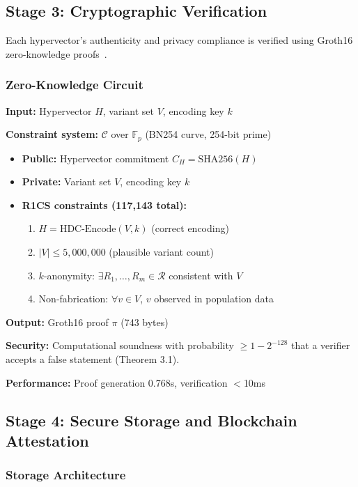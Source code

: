 \documentclass[12pt,a4paper]{article}
\begin{document}
\subsection{Stage 3: Cryptographic Verification}

Each hypervector's authenticity and privacy compliance is verified using Groth16 zero-knowledge proofs~\cite{Groth2016}.

\subsubsection{Zero-Knowledge Circuit}

\textbf{Input:} Hypervector $H$, variant set $V$, encoding key $k$

\textbf{Constraint system:} $\mathcal{C}$ over $\mathbb{F}_p$ (BN254 curve, 254-bit prime)
\begin{itemize}
\item \textbf{Public:} Hypervector commitment $C_H = \text{SHA256}(H)$
\item \textbf{Private:} Variant set $V$, encoding key $k$
\item \textbf{R1CS constraints (117,143 total):}
\begin{enumerate}
\item $H = \text{HDC-Encode}(V, k)$ (correct encoding)
\item $|V| \leq 5,000,000$ (plausible variant count)
\item $k$-anonymity: $\exists R_1, \ldots, R_m \in \mathcal{R}$ consistent with $V$
\item Non-fabrication: $\forall v \in V$, $v$ observed in population data
\end{enumerate}
\end{itemize}

\textbf{Output:} Groth16 proof $\pi$ (743 bytes)

\textbf{Security:} Computational soundness with probability $\geq 1 - 2^{-128}$ that a verifier accepts a false statement (Theorem 3.1).

\textbf{Performance:} Proof generation 0.768s, verification $<$10ms

\subsection{Stage 4: Secure Storage and Blockchain Attestation}

\subsubsection{Storage Architecture}
\end{document}
